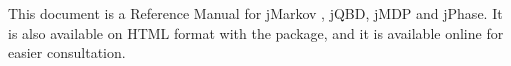 
\maketitle


\newcommand{\cS}{{\cal S}}
\newcommand{\tcS}{{\cal \tilde S}}
\newcommand{\cE}{{\cal E}}
\newcommand{\cU}{{\cal U}}
\newcommand{\cF}{{\cal F}}
\newcommand{\dref}[1]{\refdefined{#1}}




\newcommand{\lstinclude}[1]{
  \lstset{title={\Large{File #1}}}
  
}



This document is a Reference Manual for jMarkov , jQBD, jMDP and jPhase. It is also available on HTML
format with the package, and it is available online for easier consultation.

